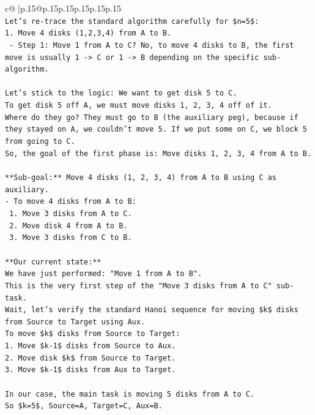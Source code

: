 \documentclass{article}
\begin{document}
{\begin{supertabular}{c@{$\;$}|p{.15\linewidth}@{}p{.15\linewidth}p{.15\linewidth}p{.15\linewidth}p{.15\linewidth}p{.15\linewidth}}
{{{\\ 
\texttt{Let's re{-}trace the standard algorithm carefully for \$n=5\$:} \\
\texttt{1. Move 4 disks (1,2,3,4) from A to B.} \\
\texttt{   {-} Step 1: Move 1 from A to C? No, to move 4 disks to B, the first move is usually 1 {-}> C or 1 {-}> B depending on the specific sub{-}algorithm.} \\
\\ 
\texttt{Let's stick to the logic: We want to get disk 5 to C.} \\
\texttt{To get disk 5 off A, we must move disks 1, 2, 3, 4 off of it.} \\
\texttt{Where do they go? They must go to B (the auxiliary peg), because if they stayed on A, we couldn't move 5. If we put some on C, we block 5 from going to C.} \\
\texttt{So, the goal of the first phase is: Move disks 1, 2, 3, 4 from A to B.} \\
\\ 
\texttt{**Sub{-}goal:** Move 4 disks (1, 2, 3, 4) from A to B using C as auxiliary.} \\
\texttt{{-} To move 4 disks from A to B:} \\
\texttt{  1. Move 3 disks from A to C.} \\
\texttt{  2. Move disk 4 from A to B.} \\
\texttt{  3. Move 3 disks from C to B.} \\
\\ 
\texttt{**Our current state:**} \\
\texttt{We have just performed: "Move 1 from A to B".} \\
\texttt{This is the very first step of the "Move 3 disks from A to C" sub{-}task.} \\
\texttt{Wait, let's verify the standard Hanoi sequence for moving \$k\$ disks from Source to Target using Aux.} \\
\texttt{To move \$k\$ disks from Source to Target:} \\
\texttt{1. Move \$k{-}1\$ disks from Source to Aux.} \\
\texttt{2. Move disk \$k\$ from Source to Target.} \\
\texttt{3. Move \$k{-}1\$ disks from Aux to Target.} \\
\\ 
\texttt{In our case, the main task is moving 5 disks from A to C.} \\
\texttt{So \$k=5\$, Source=A, Target=C, Aux=B.} \\
}}}
\end{supertabular}}
\end{document}
